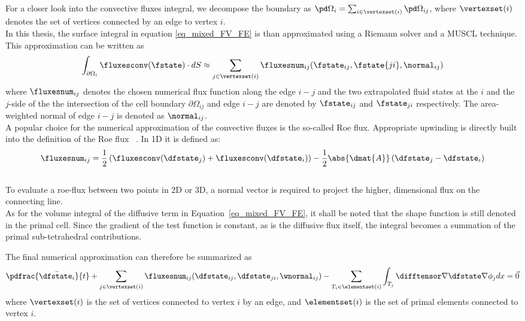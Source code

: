 \documentclass[../main.tex]{subfiles}
\begin{document}
For a closer look into the convective fluxes integral, we decompose the boundary as $\pd \Omega_i = \sum_{i \in \vertexset(i)} \pd\Omega_{ij}$, where $\vertexset(i)$ denotes the set of vertices connected by an edge to vertex $i$.\\
In this thesis, the surface integral in equation \eqref{eq_mixed_FV_FE} is than approximated using a Riemann solver and a \ac{MUSCL} \cite{VanLeer1979} technique. This approximation can be written as
\begin{align}\label{eq:convectiveterm_approximation}
\int_{\partial\Omega_i} \fluxesconv(\fstate)\cdot dS \approx
\sum_{j \in \vertexset(i)} \fluxesnum_{ij}(\fstate_{ij},\fstate{ji},\normal_{ij})
\end{align}
where $\fluxesnum_{ij}$ denotes the chosen numerical flux function along the edge $i-j$ and the two extrapolated fluid states at the $i$ and the $j$-side of the the intersection of the cell boundary $\partial \Omega_{ij}$ and edge $i-j$ are denoted by $\fstate_{ij}$ and $\fstate_{ji}$ respectively. The area-weighted normal of edge $i-j$ is denoted as $\normal_{ij}$.
 \\
 A popular choice for the numerical approximation of the convective fluxes is the so-called Roe flux. Appropriate upwinding is directly built into the definition of the Roe flux ~\cite{Roe1981}. In 1D it is defined as:
 \begin{align}
\fluxesnum_{ij}=\frac{1}{2} \left(\fluxesconv(\dfstate_j)+\fluxesconv(\dfstate_i) \right)-\frac{1}{2}\abs{
\dmat{A}} \left( \dfstate_j-\dfstate_i \right)
 \end{align}
 \\
To evaluate a roe-flux between two points in 2D or 3D, a normal vector is required to project the higher, dimensional flux on the connecting line.
\\
As for the volume integral of the diffusive term in Equation~\eqref{eq_mixed_FV_FE}, it shall be noted that the shape function is still denoted in the primal cell. Since the gradient of the test function is constant, as is the diffusive flux itself, the integral becomes a summation of the primal sub-tetrahedral contributions.


The final numerical approximation can therefore be summarized as
\begin{align}\label{eq:nse_final_discretized}
\pdfrac{\bar{\dfstate_i}}{t} +
\sum_{j \in \vertexset(i)} \fluxesnum_{ij}(\dfstate_{ij},\dfstate_{ji},\wnormal_{ij}) -
\sum_{T_i \in \elementset(i)} \int_{T_j} \difftensor \nabla \dfstate \nabla \phi_j dx =
\vec{0}
\end{align}
where $\vertexset(i)$ is the set of vertices connected to vertex $i$ by an edge, and $\elementset(i)$ is the set of primal elements connected to vertex $i$.
\end{document}
